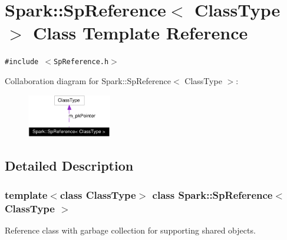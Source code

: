 \section{Spark::Sp\-Reference$<$ Class\-Type $>$ Class Template Reference}
\label{classSpark_1_1SpReference}
{\tt \#include $<$Sp\-Reference.h$>$}

Collaboration diagram for Spark::Sp\-Reference$<$ Class\-Type $>$:\begin{figure}[H]
\begin{center}
\leavevmode
\includegraphics[width=104pt]{classSpark_1_1SpReference__coll__graph}
\end{center}
\end{figure}


\subsection{Detailed Description}
\subsubsection*{template$<$class Class\-Type$>$ class Spark::Sp\-Reference$<$ Class\-Type $>$}

Reference class with garbage collection for supporting shared objects. 

